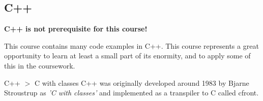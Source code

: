\subsection{C++}
\begin{center}
    \textbf{C++ is not prerequisite for this course!}
\end{center}
This course contains many code examples in C++. This course represents a great
opportunity to learn at least a small part of its enormity, and to apply some of this
in the coursework.
\begin{sidenotebox}{C++ $>$ C with classes}
    C++ was originally developed around 1983 by Bjarne Stroustrup as \textit{'C with classes'} and implemented as a transpiler to C called cfront.
\end{sidenotebox}
\noindent {}
